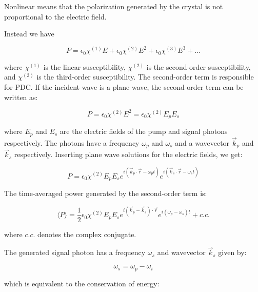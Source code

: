 \documentclass[
  a4paper,
]{book}
\begin{document}
\begin{tcolorbox}[enhanced jigsaw, coltitle=black, title=\textcolor{quarto-callout-note-color}{\faInfo}\hspace{0.5em}{Nonlinear Optics Primer}, colframe=quarto-callout-note-color-frame, toprule=.15mm, opacitybacktitle=0.6, left=2mm, opacityback=0, breakable, toptitle=1mm, bottomtitle=1mm, leftrule=.75mm, arc=.35mm, titlerule=0mm, colbacktitle=quarto-callout-note-color!10!white, rightrule=.15mm, bottomrule=.15mm, colback=white]

Nonlinear means that the polarization generated by the crystal is not
proportional to the electric field.

Instead we have

\[
P = \epsilon_0 \chi^{(1)} E + \epsilon_0 \chi^{(2)} E^2 + \epsilon_0 \chi^{(3)} E^3 + \ldots
\]

where \(\chi^{(1)}\) is the linear susceptibility, \(\chi^{(2)}\) is the
second-order susceptibility, and \(\chi^{(3)}\) is the third-order
susceptibility. The second-order term is responsible for PDC. If the
incident wave is a plane wave, the second-order term can be written as:

\[
P = \epsilon_0 \chi^{(2)} E^2 = \epsilon_0 \chi^{(2)} E_p E_s
\]

where \(E_p\) and \(E_s\) are the electric fields of the pump and signal
photons respectively. The photons have a frequency \(\omega_p\) and
\(\omega_s\) and a wavevector \(\vec{k}_p\) and \(\vec{k}_s\)
respectively. Inserting plane wave solutions for the electric fields, we
get:

\[
P = \epsilon_0 \chi^{(2)} E_p E_s e^{i(\vec{k}_p \cdot \vec{r} - \omega_p t)} e^{i(\vec{k}_s \cdot \vec{r} - \omega_s t)}
\]

The time-averaged power generated by the second-order term is:

\[
\langle P \rangle = \frac{1}{2} \epsilon_0 \chi^{(2)} E_p E_s e^{i(\vec{k}_p - \vec{k}_s) \cdot \vec{r}} e^{i(\omega_p - \omega_s) t} + c.c.
\]

where \(c.c.\) denotes the complex conjugate.

\end{tcolorbox}

The generated signal photon has a frequency \(\omega_s\) and wavevector
\(\vec{k}_s\) given by:

\[
\omega_s = \omega_p - \omega_i
\]

which is equivalent to the conservation of energy:
\end{document}
